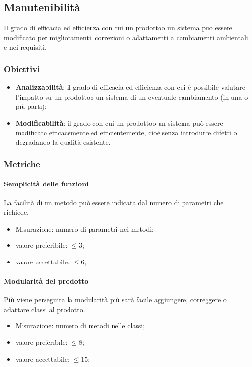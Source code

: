     \subsection{Manutenibilità}
        Il grado di efficacia ed efficienza con cui un prodotto\glosp o un sistema può essere modificato per miglioramenti, correzioni o adattamenti a cambiamenti ambientali e nei requisiti.
        \subsubsection{Obiettivi}
        \begin{itemize}
            \item \textbf{Analizzabilità}: il grado di efficacia ed efficienza con cui è possibile valutare l'impatto su un prodotto\glosp o un sistema di un eventuale cambiamento (in una o più parti);
            \item \textbf{Modificabilità}: il grado con cui un prodotto\glosp o un sistema può essere modificato efficacemente ed efficientemente, cioè senza introdurre difetti o degradando la qualità esistente.
        \end{itemize}
        \subsubsection{Metriche}
            \paragraph{Semplicità delle funzioni}
                La facilità di un metodo può essere indicata dal numero di parametri che richiede.
                \begin{itemize}
                    \item Misurazione: numero di parametri nei metodi;
                    \item valore preferibile: $\leq 3$;
                    \item valore accettabile: $\leq 6$;
                \end{itemize}
            \paragraph{Modularità del prodotto}
                Più viene perseguita la modularità più sarà facile aggiungere, correggere o adattare classi al prodotto\glo.
                \begin{itemize}
                    \item Misurazione: numero di metodi nelle classi;
                    \item valore preferibile: $\leq 8$;
                    \item valore accettabile: $\leq 15$;
                \end{itemize}
